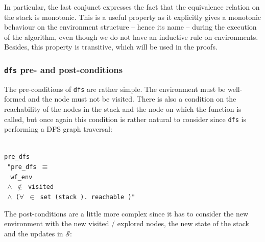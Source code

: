 \documentclass[a4 paper, 12pt]{article}
\newcommand{\where}{{\color{isa_green}{where}}}
\newcommand{\isa}[1]{\small\texttt{\\\noindent#1}}
\newcommand{\bblue}[1]{{\color{isa_blue}{#1}}}
\newcommand{\green}[1]{{\color{isa_dark_green}{#1}}}
\begin{document}
{In particular, the last conjunct expresses the fact that the equivalence relation on the stack is monotonic. This is a useful property as it explicitly gives a monotonic behaviour on the environment structure -- hence its name -- during the execution of the algorithm, even though we do not have an inductive rule on environments. Besides, this property is transitive, which will be used in the proofs.

\BlankLine
\BlankLine

\subsubsection{\texttt{dfs} pre- and post-conditions}
The pre-conditions of \texttt{dfs} are rather simple. The environment must be well-formed and the node must not be visited. There is also a condition on the reachability of the nodes in the stack and the node on which the function is called, but once again this condition is rather natural to consider since \texttt{dfs} is performing a DFS graph traversal:

\isa{
\bblue{definition} pre\_dfs \where\\
$~~$"pre\_dfs \green{v e} $\equiv$\\
$~~~~$wf\_env \green{e}\\
$~~$$\wedge$ \green{v} $\notin$ visited \green{e}\\
$~~$$\wedge$ ($\forall$ \green{n} $\in$ set (stack \green{e}). reachable \green{n v})"
}

\BlankLine
\BlankLine

The post-conditions are a little more complex since it has to consider the new environment with the new visited / explored nodes, the new state of the stack and the updates in $\mathcal{S}$:

}
\end{document}
